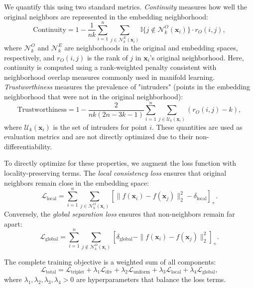 \documentclass[a4paper,12pt,reqno]{amsart}
\theoremstyle{definition}
\theoremstyle{remark}
\begin{document}
We quantify this using two standard metrics. \textit{Continuity} measures how well the original neighbors are represented in the embedding neighborhood:
\begin{equation}
	\text{Continuity} = 1 - \frac{1}{nk} \sum_{i=1}^n \sum_{j \in \mathcal{N}_k^E(\mathbf{x}_i)} \mathbb{I}\{j \notin \mathcal{N}_k^O(\mathbf{x}_i)\} \cdot r_O(i,j),
\end{equation}
where $\mathcal{N}_k^O$ and $\mathcal{N}_k^E$ are neighborhoods in the original and embedding spaces, respectively, and $r_O(i,j)$ is the rank of $j$ in $\mathbf{x}_i$'s original neighborhood. Here, continuity is computed using a rank-weighted penalty consistent with neighborhood overlap measures commonly used in manifold learning. \textit{Trustworthiness} measures the prevalence of "intruders" (points in the embedding neighborhood that were not in the original neighborhood):
\begin{equation}
	\text{Trustworthiness} = 1 - \frac{2}{nk(2n - 3k - 1)} \sum_{i=1}^n \sum_{j \in \mathcal{U}_k(\mathbf{x}_i)} (r_O(i,j) - k),
\end{equation}
where $\mathcal{U}_k(\mathbf{x}_i)$ is the set of intruders for point $i$. These quantities are used as evaluation metrics and are not directly optimized due to their non-differentiability.


To directly optimize for these properties, we augment the loss function with locality-preserving terms. The \textit{local consistency loss} ensures that original neighbors remain close in the embedding space:
\begin{equation}
	\mathcal{L}_{\text{local}} = \sum_{i=1}^n \sum_{j \in \mathcal{N}_k^O(\mathbf{x}_i)} \left[ \|f(\mathbf{x}_i) - f(\mathbf{x}_j)\|_2^2 - \delta_{\text{local}}\right]_+.
\end{equation}
Conversely, the \textit{global separation loss} ensures that non-neighbors remain far apart:
\begin{equation}
	\mathcal{L}_{\text{global}} = \sum_{i=1}^n \sum_{j \notin \mathcal{N}_k^O(\mathbf{x}_i)} \left[\delta_{\text{global}} - \|f(\mathbf{x}_i) - f(\mathbf{x}_j)\|_2^2\right]_+.
\end{equation}

The complete training objective is a weighted sum of all components:
\begin{equation}
	\mathcal{L}_{\text{total}} = \mathcal{L}_{\text{triplet}} + \lambda_1 \mathcal{L}_{\text{div}} + \lambda_2 \mathcal{L}_{\text{uniform}} + \lambda_3 \mathcal{L}_{\text{local}} + \lambda_4 \mathcal{L}_{\text{global}},
\end{equation}
where $\lambda_1, \lambda_2, \lambda_3, \lambda_4 > 0$ are hyperparameters that balance the loss terms.
\end{document}
